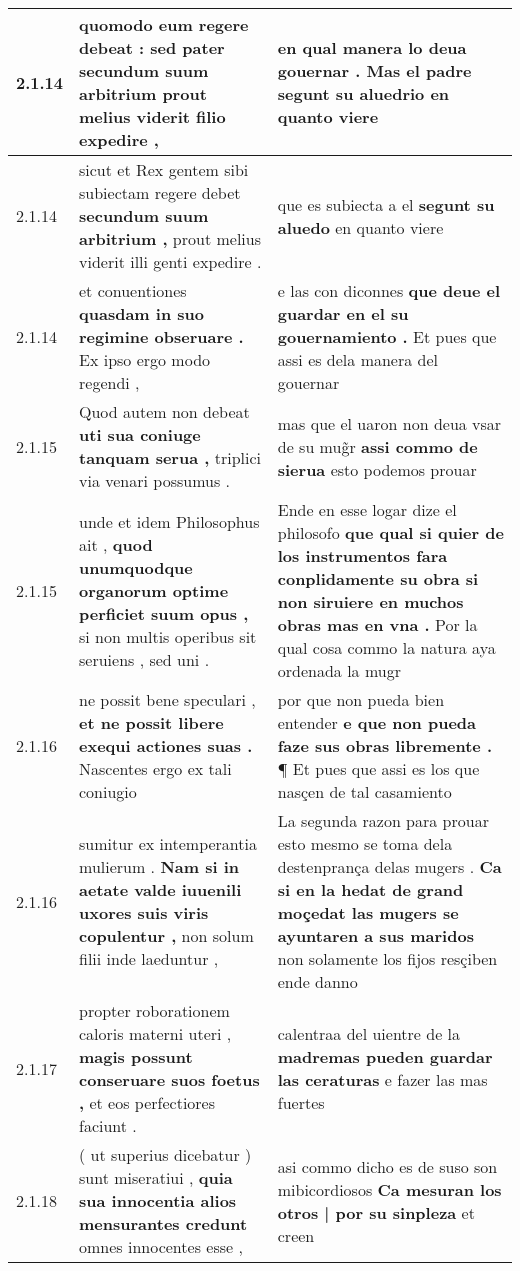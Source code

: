 \begin{tabular}{|p{1cm}|p{6.5cm}|p{6.5cm}|}
2.1.14 & quomodo eum regere debeat : \textbf{ sed pater secundum suum arbitrium } prout melius viderit filio expedire , & en qual manera lo deua gouernar . \textbf{ Mas el padre segunt su aluedrio } en quanto viere \\\hline
2.1.14 & sicut et Rex gentem sibi subiectam regere debet \textbf{ secundum suum arbitrium , } prout melius viderit illi genti expedire . & que es subiecta a el \textbf{ segunt su aluedo } en quanto viere \\\hline
2.1.14 & et conuentiones \textbf{ quasdam in suo regimine obseruare . } Ex ipso ergo modo regendi , & e las con diconnes \textbf{ que deue el guardar en el su gouernamiento . } Et pues que assi es dela manera del gouernar \\\hline
2.1.15 & Quod autem non debeat \textbf{ uti sua coniuge tanquam serua , } triplici via venari possumus . & mas que el uaron non deua vsar de su mug̃r \textbf{ assi commo de sierua } esto podemos prouar \\\hline
2.1.15 & unde et idem Philosophus ait , \textbf{ quod unumquodque organorum optime perficiet suum opus , } si non multis operibus sit seruiens , sed uni . & Ende en esse logar dize el philosofo \textbf{ que qual si quier de los instrumentos fara conplidamente su obra si non siruiere en muchos obras mas en vna . } Por la qual cosa commo la natura aya ordenada la mugr \\\hline
2.1.16 & ne possit bene speculari , \textbf{ et ne possit libere exequi actiones suas . } Nascentes ergo ex tali coniugio & por que non pueda bien entender \textbf{ e que non pueda faze sus obras libremente . } ¶ Et pues que assi es los que nasçen de tal casamiento \\\hline
2.1.16 & sumitur ex intemperantia mulierum . \textbf{ Nam si in aetate valde iuuenili uxores suis viris copulentur , } non solum filii inde laeduntur , & La segunda razon para prouar esto mesmo se toma dela destenprança delas mugers . \textbf{ Ca si en la hedat de grand moçedat las mugers se ayuntaren a sus maridos } non solamente los fijos resçiben ende danno \\\hline
2.1.17 & propter roborationem caloris materni uteri , \textbf{ magis possunt conseruare suos foetus , } et eos perfectiores faciunt . & calentraa del uientre de la \textbf{ madremas pueden guardar las ceraturas } e fazer las mas fuertes \\\hline
2.1.18 & ( ut superius dicebatur ) sunt miseratiui , \textbf{ quia sua innocentia alios mensurantes credunt } omnes innocentes esse , & asi commo dicho es de suso son mibicordiosos \textbf{ Ca mesuran los otros | por su sinpleza } et creen \\\hline

\end{tabular}

